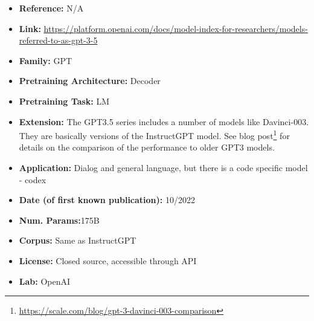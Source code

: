 \documentclass{article}
\begin{document}
            \begin{itemize}
                \item \textbf{Reference:} N/A
                \item \textbf{Link:} \url{https://platform.openai.com/docs/model-index-for-researchers/models-referred-to-as-gpt-3-5}
                \item \textbf{Family:} GPT 
                \item \textbf{Pretraining Architecture:} Decoder
                \item \textbf{Pretraining Task:} LM
                \item \textbf{Extension:} The GPT3.5 series includes a number of models like Davinci-003. They are basically versions of the InstructGPT model. See blog post\footnote{\url{https://scale.com/blog/gpt-3-davinci-003-comparison}} for details on the comparison of the performance to older GPT3 models.  
                \item \textbf{Application:} Dialog and general language, but there is a code specific model - codex
                \item \textbf{Date (of first known publication):} 10/2022
                \item \textbf{Num. Params:}175B
                \item \textbf{Corpus:} Same as InstructGPT
                \item \textbf{License:} Closed source, accessible through API
                \item \textbf{Lab:} OpenAI
            \end{itemize}
            
\end{document}
